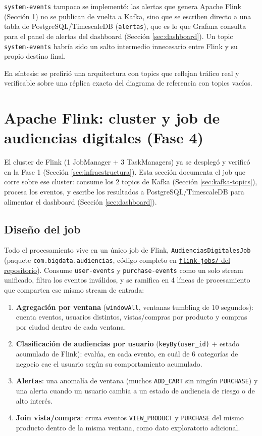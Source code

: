 \texttt{system-events} tampoco se implementó: las alertas que genera Apache Flink (Sección \ref{sec:flink}) no se publican de vuelta a Kafka, sino que se escriben directo a una tabla de PostgreSQL/TimescaleDB (\texttt{alertas}), que es lo que Grafana consulta para el panel de alertas del dashboard (Sección \ref{sec:dashboard}). Un topic \texttt{system-events} habría sido un salto intermedio innecesario entre Flink y su propio destino final.

En síntesis: se prefirió una arquitectura con topics que reflejan tráfico real y verificable sobre una réplica exacta del diagrama de referencia con topics vacíos.

\clearpage
\section{Apache Flink: cluster y job de audiencias digitales (Fase 4)}
\label{sec:flink}

El cluster de Flink (1 JobManager + 3 TaskManagers) ya se desplegó y verificó en la Fase 1 (Sección \ref{sec:infraestructura}). Esta sección documenta el job que corre sobre ese cluster: consume los 2 topics de Kafka (Sección \ref{sec:kafka-topics}), procesa los eventos, y escribe los resultados a PostgreSQL/TimescaleDB para alimentar el dashboard (Sección \ref{sec:dashboard}).

\subsection{Diseño del job}

Todo el procesamiento vive en un único job de Flink, \texttt{AudienciasDigitalesJob} (paquete \texttt{com.bigdata.audiencias}, código completo en \href{https://github.com/Noodle96/Big_Data/tree/main/digital-audience-streaming-platform/flink-jobs}{\texttt{flink-jobs/} del repositorio}). Consume \texttt{user-events} y \texttt{purchase-events} como un solo stream unificado, filtra los eventos inválidos, y se ramifica en 4 líneas de procesamiento que comparten ese mismo stream de entrada:

\begin{enumerate}
\item \textbf{Agregación por ventana} (\texttt{windowAll}, ventanas tumbling de 10 segundos): cuenta eventos, usuarios distintos, vistas/compras por producto y compras por ciudad dentro de cada ventana.
\item \textbf{Clasificación de audiencias por usuario} (\texttt{keyBy(user\_id)} + estado acumulado de Flink): evalúa, en cada evento, en cuál de 6 categorías de negocio cae el usuario según su comportamiento acumulado.
\item \textbf{Alertas}: una anomalía de ventana (muchos \texttt{ADD\_CART} sin ningún \texttt{PURCHASE}) y una alerta cuando un usuario cambia a un estado de audiencia de riesgo o de alto interés.
\item \textbf{Join vista/compra}: cruza eventos \texttt{VIEW\_PRODUCT} y \texttt{PURCHASE} del mismo producto dentro de la misma ventana, como dato exploratorio adicional.
\end{enumerate}

